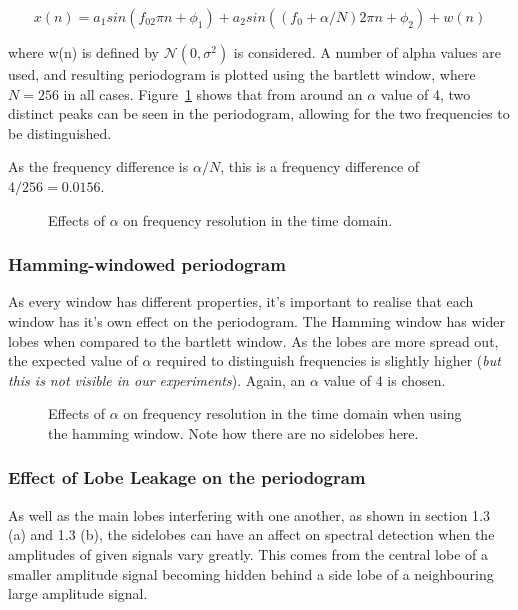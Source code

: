 \documentclass[main.tex]{subfiles}
\begin{document}
\begin{equation}
x(n) = a_1sin(f_02\pi n + \phi_1) + a_2sin((f_0+\alpha/N)2\pi n + \phi_2) + w(n)
\end{equation}

where w(n) is defined by $\mathcal{N}(0, \sigma^2)$ is considered. A number of alpha values are used, and resulting periodogram is plotted using the bartlett window, where $N=256$ in all cases. Figure~\ref{fig:q1_3_b} shows that from around an $\alpha$ value of 4, two distinct peaks can be seen in the periodogram, allowing for the two frequencies to be distinguished. 

As the frequency difference is $\alpha/N$, this is a frequency difference of $4/256 = 0.0156$.

\begin{figure}[H]
	\centering 
	\resizebox{\textwidth}{!}{}
	\caption{Effects of $\alpha$ on frequency resolution in the time domain.}
	\label{fig:q1_3_b}
\end{figure}




\subsubsection{Hamming-windowed periodogram}

As every window has different properties, it's important to realise that each window has it's own effect on the periodogram. The Hamming window has wider lobes when compared to the bartlett window. As the lobes are more spread out, the expected value of $\alpha$ required to distinguish frequencies is slightly higher (\textit{but this is not visible in our experiments}). Again, an $\alpha$ value of $4$ is chosen.

\begin{figure}[H]
	\centering 
	\resizebox{\textwidth}{!}{}
	\caption{Effects of $\alpha$ on frequency resolution in the time domain when using the hamming window. Note how there are no sidelobes here.}
	\label{fig:q1_3_c}
\end{figure}






\subsubsection{Effect of Lobe Leakage on the periodogram}

As well as the main lobes interfering with one another, as shown in section 1.3 (a) and 1.3 (b), the sidelobes can have an affect on spectral detection when the amplitudes of given signals vary greatly. This comes from the central lobe of a smaller amplitude signal becoming hidden behind a side lobe of a neighbouring large amplitude signal.
\end{document}
